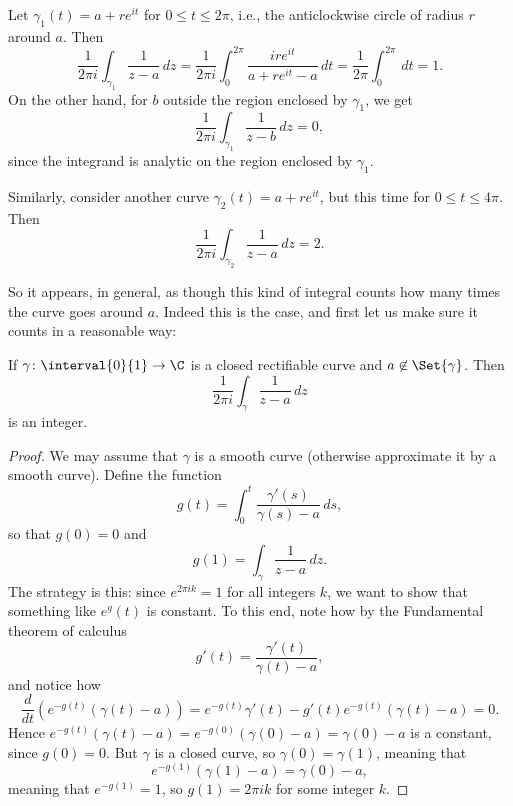 


Let $\gamma_1(t) = a + r e^{i t}$ for $0 \leq t \leq 2 \pi$, i.e., the anticlockwise circle of radius $r$ around $a$.
Then
\[
	\frac{1}{2 \pi i} \int_{\gamma_1} \frac{1}{z - a} \, d z = \frac{1}{2 \pi i} \int_0^{2 \pi} \frac{i r e^{i t}}{a + r e^{i t} - a} \, d t = \frac{1}{2 \pi} \int_0^{2 \pi} \, d t = 1.
\]
On the other hand, for $b$ outside the region enclosed by $\gamma_1$, we get
\[
	\frac{1}{2 \pi i} \int_{\gamma_1} \frac{1}{z - b} \, d z = 0,
\]
since the integrand is analytic on the region enclosed by $\gamma_1$.

Similarly, consider another curve $\gamma_2(t) = a + r e^{i t}$, but this time for $0 \leq t \leq 4 \pi$.
Then
\[
	\frac{1}{2 \pi i} \int_{\gamma_2} \frac{1}{z - a} \, d z = 2.
\]

So it appears, in general, as though this kind of integral counts how many times the curve goes around $a$.
Indeed this is the case, and first let us make sure it counts in a reasonable way:

\begin{proposition}\label{prop4.1}
	If $\gamma \colon \interval{0}{1} \to \C$ is a closed rectifiable curve and $a \not\in \Set{\gamma}$.
	Then
	\[
		\frac{1}{2 \pi i} \int_\gamma \frac{1}{z - a} \, d z
	\]
	is an integer.
\end{proposition}

\begin{proof}
	We may assume that $\gamma$ is a smooth curve (otherwise approximate it by a smooth curve).
	Define the function
	\[
		g(t) = \int_0^t \frac{\gamma'(s)}{\gamma(s) - a} \, d s,
	\]
	so that $g(0) = 0$ and
	\[
		g(1) = \int_\gamma \frac{1}{z - a} \, d z.
	\]
	The strategy is this: since $e^{2 \pi i k} = 1$ for all integers $k$, we want to show that something like $e^g(t)$ is constant.
	To this end, note how by the Fundamental theorem of calculus
	\[
		g'(t) = \frac{\gamma'(t)}{\gamma(t) - a},
	\]
	and notice how
	\[
		\frac{d}{d t} \left ( e^{-g(t)} (\gamma(t) - a) \right ) = e^{-g(t)} \gamma'(t) - g'(t) e^{-g(t)} (\gamma(t) - a) = 0.
	\]
	Hence $e^{-g(t)} (\gamma(t) -a) = e^{-g(0)} (\gamma(0) - a) = \gamma(0) - a$ is a constant, since $g(0) = 0$.
	But $\gamma$ is a closed curve, so $\gamma(0) = \gamma(1)$, meaning that
	\[
		e^{-g(1)} (\gamma(1) - a) = \gamma(0) - a,
	\]
	meaning that $e^{-g(1)} = 1$, so $g(1) = 2 \pi i k$ for some integer $k$.
\end{proof}

